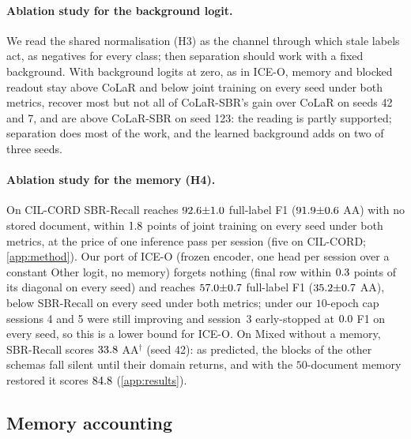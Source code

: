 \documentclass[10pt,twocolumn,letterpaper]{article}
\begin{document}
\paragraph{Ablation study for the background logit.} We read the shared normalisation (H3) as the channel through which stale labels act, as negatives for every class; then separation should work with a fixed background. With background logits at zero, as in ICE-O, memory and blocked readout stay above CoLaR and below joint training on every seed under both metrics, recover most but not all of CoLaR-SBR's gain over CoLaR on seeds 42 and 7, and are above CoLaR-SBR on seed 123: the reading is partly supported; separation does most of the work, and the learned background adds on two of three seeds.

\paragraph{Ablation study for the memory (H4).} On CIL-CORD SBR-Recall reaches $92.6{\pm}1.0$ full-label F1 ($91.9{\pm}0.6$ AA) with no stored document, within $1.8$ points of joint training on every seed under both metrics, at the price of one inference pass per session (five on CIL-CORD; \cref{app:method}). Our port of ICE-O (frozen encoder, one head per session over a constant Other logit, no memory) forgets nothing (final row within $0.3$ points of its diagonal on every seed) and reaches $57.0{\pm}0.7$ full-label F1 ($35.2{\pm}0.7$ AA), below SBR-Recall on every seed under both metrics; under our $10$-epoch cap sessions 4 and 5 were still improving and session~3 early-stopped at $0.0$ F1 on every seed, so this is a lower bound for ICE-O. On Mixed without a memory, SBR-Recall scores $33.8$ AA$^\dagger$ (seed 42): as predicted, the blocks of the other schemas fall silent until their domain returns, and with the $50$-document memory restored it scores $84.8$ (\cref{app:results}).

\subsection{Memory accounting}
\label{sec:cost}
\begin{table}[t]
\centering\small
\setlength{\tabcolsep}{4pt}
\caption{\textbf{Memory comparison on CIL-CORD}: what each method keeps across sessions, its size, and the accuracy it reaches. $^{k}$Size computed from tensor shapes or parameter counts (fp32 as our code holds them, unless stated; SBR-Recall at two bytes per parameter); the other sizes were recorded by the runs. $^{l}$Not counted in the size. Marks on the accuracy cells as in \cref{tab:main}.}
\label{tab:memcmp}

\end{table}
\end{document}
